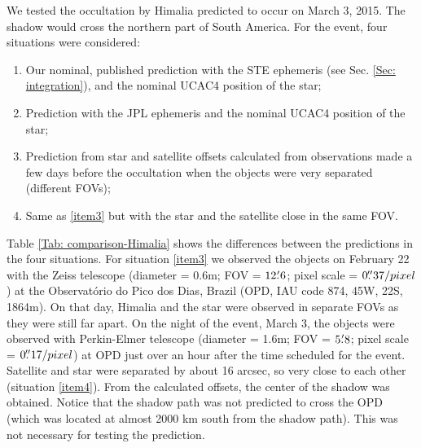\documentclass[useAMS,usenatbib]{mn2e}
\begin{document}
We tested the occultation by Himalia predicted to occur on March 3, 2015. The shadow would cross the northern part of South America. For the event, four situations were considered:
\begin{enumerate}[I]
\item\label{item1} Our nominal, published prediction with the STE ephemeris (see Sec. \ref{Sec: integration}), and the nominal UCAC4 position of the star;
\item\label{item2} Prediction with the JPL ephemeris and the nominal UCAC4 position of the star;
\item\label{item3} Prediction from star and satellite offsets calculated from observations made a few days before the occultation when the objects were very separated (different FOVs);
\item\label{item4} Same as \ref{item3} but with the star and the satellite close in the same FOV.
\end{enumerate}

Table \ref{Tab: comparison-Himalia} shows the differences between the predictions in the four situations. For situation \ref{item3} we observed the objects on February 22 with the Zeiss telescope (diameter = 0.6m; FOV = $12\hbox{$.\mkern-4mu^\prime$}6$; pixel scale = $0\hbox{$.\!\!^{\prime\prime}$}37 / pixel$) at the Observatório do Pico dos Dias, Brazil (OPD, IAU code 874, 45\arcsec W, 22\arcsec S, 1864m). On that day, Himalia and the star were observed in separate FOVs as they were still far apart. On the night of the event, March 3, the objects were observed with Perkin-Elmer telescope (diameter = 1.6m; FOV = $5\hbox{$.\mkern-4mu^\prime$}8$; pixel scale = $0\hbox{$.\!\!^{\prime\prime}$}17 / pixel$) at OPD just over an hour after the time scheduled for the event. Satellite and star were separated by about 16 arcsec, so very close to each other (situation \ref{item4}). From the calculated offsets, the center of the shadow was obtained. Notice that the shadow path was not predicted to cross the OPD (which was located at almost 2000 km south from the shadow path). This was not necessary for testing the prediction.
\end{document}
